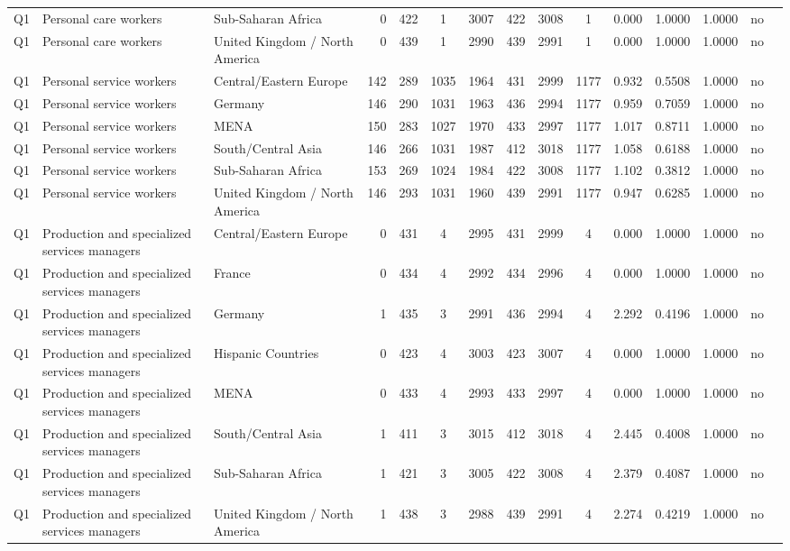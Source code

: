 \begin{longtable}{lllrcccccccccll}
Q1 & Personal care workers & Sub-Saharan Africa & 0 & 422 & 1 & 3007 & 422 & 3008 & 1 & 0.000 & 1.0000 & 1.0000 & no \\
Q1 & Personal care workers & United Kingdom / North America & 0 & 439 & 1 & 2990 & 439 & 2991 & 1 & 0.000 & 1.0000 & 1.0000 & no \\
Q1 & Personal service workers & Central/Eastern Europe & 142 & 289 & 1035 & 1964 & 431 & 2999 & 1177 & 0.932 & 0.5508 & 1.0000 & no \\
Q1 & Personal service workers & Germany & 146 & 290 & 1031 & 1963 & 436 & 2994 & 1177 & 0.959 & 0.7059 & 1.0000 & no \\
Q1 & Personal service workers & MENA & 150 & 283 & 1027 & 1970 & 433 & 2997 & 1177 & 1.017 & 0.8711 & 1.0000 & no \\
Q1 & Personal service workers & South/Central Asia & 146 & 266 & 1031 & 1987 & 412 & 3018 & 1177 & 1.058 & 0.6188 & 1.0000 & no \\
Q1 & Personal service workers & Sub-Saharan Africa & 153 & 269 & 1024 & 1984 & 422 & 3008 & 1177 & 1.102 & 0.3812 & 1.0000 & no \\
Q1 & Personal service workers & United Kingdom / North America & 146 & 293 & 1031 & 1960 & 439 & 2991 & 1177 & 0.947 & 0.6285 & 1.0000 & no \\
Q1 & Production and specialized services managers & Central/Eastern Europe & 0 & 431 & 4 & 2995 & 431 & 2999 & 4 & 0.000 & 1.0000 & 1.0000 & no \\
Q1 & Production and specialized services managers & France & 0 & 434 & 4 & 2992 & 434 & 2996 & 4 & 0.000 & 1.0000 & 1.0000 & no \\
Q1 & Production and specialized services managers & Germany & 1 & 435 & 3 & 2991 & 436 & 2994 & 4 & 2.292 & 0.4196 & 1.0000 & no \\
Q1 & Production and specialized services managers & Hispanic Countries & 0 & 423 & 4 & 3003 & 423 & 3007 & 4 & 0.000 & 1.0000 & 1.0000 & no \\
Q1 & Production and specialized services managers & MENA & 0 & 433 & 4 & 2993 & 433 & 2997 & 4 & 0.000 & 1.0000 & 1.0000 & no \\
Q1 & Production and specialized services managers & South/Central Asia & 1 & 411 & 3 & 3015 & 412 & 3018 & 4 & 2.445 & 0.4008 & 1.0000 & no \\
Q1 & Production and specialized services managers & Sub-Saharan Africa & 1 & 421 & 3 & 3005 & 422 & 3008 & 4 & 2.379 & 0.4087 & 1.0000 & no \\
Q1 & Production and specialized services managers & United Kingdom / North America & 1 & 438 & 3 & 2988 & 439 & 2991 & 4 & 2.274 & 0.4219 & 1.0000 & no \\

\end{longtable}
